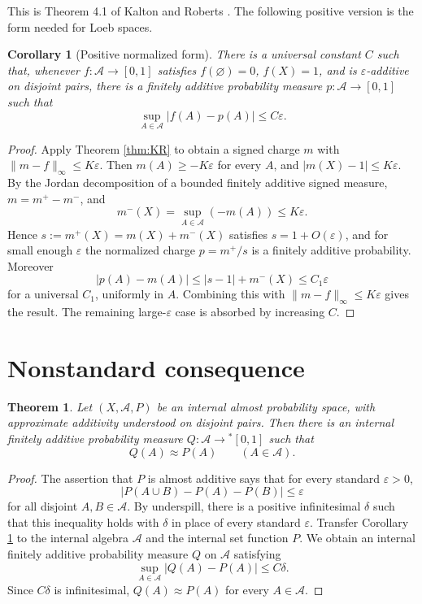 \documentclass[11pt]{amsart}
\newtheorem{theorem}{Theorem}
\newtheorem{corollary}{Corollary}
\newcommand{\cA}{\mathcal A}
\newcommand{\eps}{\varepsilon}
\begin{document}
This is Theorem 4.1 of Kalton and Roberts \cite{KR}.  The following positive
version is the form needed for Loeb spaces.

\begin{corollary}[Positive normalized form]\label{cor:positive}
There is a universal constant \(C\) such that, whenever \(f:\cA\to[0,1]\)
satisfies \(f(\varnothing)=0\), \(f(X)=1\), and is \(\eps\)-additive on
disjoint pairs, there is a finitely additive probability measure
\(p:\cA\to[0,1]\) such that
\[
  \sup_{A\in\cA}|f(A)-p(A)|\leq C\eps.
\]
\end{corollary}

\begin{proof}
Apply Theorem \ref{thm:KR} to obtain a signed charge \(m\) with
\(\|m-f\|_\infty\leq K\eps\).  Then \(m(A)\geq -K\eps\) for every \(A\), and
\(|m(X)-1|\leq K\eps\).  By the Jordan decomposition of a bounded finitely
additive signed measure, \(m=m^+-m^-\), and
\[
  m^-(X)=\sup_{A\in\cA}(-m(A))\leq K\eps.
\]
Hence \(s:=m^+(X)=m(X)+m^-(X)\) satisfies \(s=1+O(\eps)\), and for small enough
\(\eps\) the normalized charge \(p=m^+/s\) is a finitely additive probability.
Moreover
\[
  |p(A)-m(A)|\leq |s-1|+m^-(X)\leq C_1\eps
\]
for a universal \(C_1\), uniformly in \(A\).  Combining this with
\(\|m-f\|_\infty\leq K\eps\) gives the result.  The remaining large-\(\eps\)
case is absorbed by increasing \(C\).
\end{proof}

\section{Nonstandard consequence}

\begin{theorem}\label{thm:internal-close}
Let \((X,\cA,P)\) be an internal almost probability space, with approximate
additivity understood on disjoint pairs.  Then there is an internal finitely
additive probability measure \(Q:\cA\to{}^*[0,1]\) such that
\[
  Q(A)\approx P(A)\qquad(A\in\cA).
\]
\end{theorem}

\begin{proof}
The assertion that \(P\) is almost additive says that for every standard
\(\eps>0\),
\[
  |P(A\cup B)-P(A)-P(B)|\leq \eps
\]
for all disjoint \(A,B\in\cA\).  By underspill, there is a positive
infinitesimal \(\delta\) such that this inequality holds with \(\delta\) in
place of every standard \(\eps\).  Transfer Corollary \ref{cor:positive} to
the internal algebra \(\cA\) and the internal set function \(P\).  We obtain an
internal finitely additive probability measure \(Q\) on \(\cA\) satisfying
\[
  \sup_{A\in\cA}|Q(A)-P(A)|\leq C\delta.
\]
Since \(C\delta\) is infinitesimal, \(Q(A)\approx P(A)\) for every
\(A\in\cA\).
\end{proof}
\end{document}
